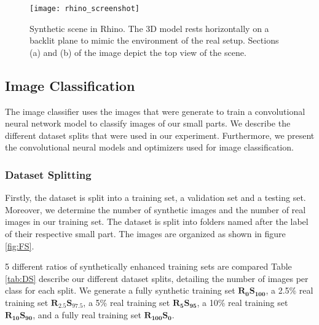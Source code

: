 \begin{figure}[H]
\centering
  \texttt{[image: rhino\_screenshot]}
\caption{Synthetic scene in Rhino. The 3D model rests horizontally on a backlit plane to mimic the environment of the real setup. Sections (a) and (b) of the image depict the top view of the scene.}
\label{fig:RhinoScreenshot}
\end{figure}

\subsection{Image Classification}\label{sec:image_classification_subsec}

The image classifier uses the images that were generate to train a convolutional neural network model to classify images of our small parts. We describe the different dataset splits that were used in our experiment. Furthermore, we present the convolutional neural models and optimizers used for image classification.

\subsubsection{Dataset Splitting}
Firstly, the dataset is split into a training set, a validation set and a testing set. Moreover, we determine the number of synthetic images and the number of real images in our training set. The dataset is split into folders named after the label of their respective small part. The images are organized as shown in figure \ref{fig:FS}.

5 different ratios of synthetically enhanced training sets are compared Table \ref{tab:DS} describe our different dataset splits, detailing the number of images per class for each split. We generate a fully synthetic training set $\boldsymbol{R_{0}S_{100}}$, a 2.5\% real training set $\boldsymbol{R_{2.5}S_{97.5}}$, a 5\% real training set $\boldsymbol{R_{5}S_{95}}$, a 10\% real training set $\boldsymbol{R_{10}S_{90}}$, and a fully real training set $\boldsymbol{R_{100}S_{0}}$. 

